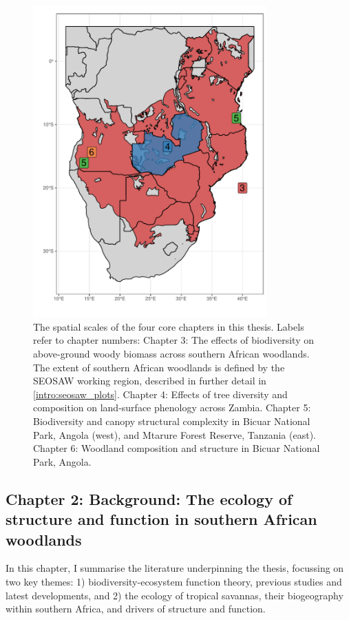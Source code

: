 \begin{refsection}
\begin{figure}[p]
\centering
	\includegraphics[width=0.8\textwidth]{img/thesis_map}
	\caption[Map of thesis study locations]{The spatial scales of the four core chapters in this thesis. Labels refer to chapter numbers: Chapter 3: The effects of biodiversity on above-ground woody biomass across southern African woodlands. The extent of southern African woodlands is defined by the SEOSAW working region, described in further detail in \autoref{intro:seosaw_plots}. Chapter 4: Effects of tree diversity and composition on land-surface phenology across Zambia. Chapter 5: Biodiversity and canopy structural complexity in Bicuar National Park, Angola (west), and Mtarure Forest Reserve, Tanzania (east). Chapter 6: Woodland composition and structure in Bicuar National Park, Angola.}
	\label{intro:thesis_map}
\end{figure}

\subsection{Chapter 2: Background: The ecology of structure and function in southern African woodlands}
\label{intro:ssec:chp2}

In this chapter, I summarise the literature underpinning the thesis, focussing on two key themes: 1) biodiversity-ecosystem function theory, previous studies and latest developments, and 2) the ecology of tropical savannas, their biogeography within southern Africa, and drivers of structure and function.


\end{refsection}
